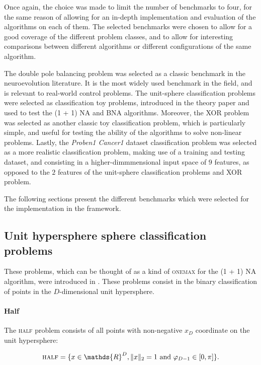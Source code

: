 Once again, the choice was made to limit the number of benchmarks to four, for the same reason of allowing for an in-depth implementation and evaluation of the algorithms on each of them.
The selected benchmarks were chosen to allow for a good coverage of the different problem classes, and to allow for interesting comparisons between different algorithms or different
configurations of the same algorithm.

The double pole balancing problem was selected as a classic benchmark in the neuroevolution literature. It is the most widely used benchmark in the field, and is relevant to real-world
control problems. The unit-sphere classification problems were selected as classification toy problems, introduced in the theory paper \cite{na} and used to test the (1 + 1) NA and BNA algorithms.
Moreover, the XOR problem was selected as another classic toy classification problem, which is particularly simple, and useful for testing the ability of the algorithms to solve non-linear problems.
Lastly, the \textit{Proben1 Cancer1} dataset classification problem was selected as a more realistic classification problem, making use of a training and testing dataset, and consisting
in a higher-dimmmensional input space of $9$ features, as opposed to the $2$ features of the unit-sphere classification problems and XOR problem.

The following sections present the different benchmarks which were selected for the implementation in the framework.

\subsection{Unit hypersphere sphere classification problems}
\label{subsection:sphere_classification}


These problems, which can be thought of as a kind of \textsc{onemax} for the (1 + 1) NA algorithm, were introduced in \cite{na}.
These problems consist in the binary classification of points in the $D$-dimensional unit hypersphere.

\paragraph{Half}
The \textsc{half} problem consists of all points with non-negative $x_D$ coordinate on the unit hypersphere:

\[
    \textsc{half} = \{x \in \mathds{R}^D, \lVert x \rVert_2 = 1 \text{ and } \varphi_{D-1} \in [0, \pi]\}.
\]

